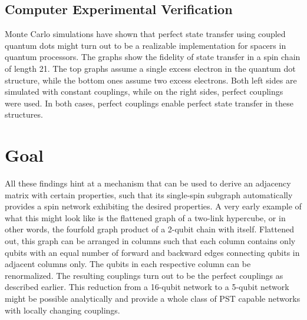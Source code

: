 \subsection{Computer Experimental Verification}

\begin{center}
\end{center}

\noindent Monte Carlo simulations have shown\cite{Nikolopoulos2004} that perfect state transfer using coupled quantum dots might turn out to be a realizable implementation for spacers in quantum processors. The graphs show the fidelity of state transfer in a spin chain of length 21. The top graphs assume a single excess electron in the quantum dot structure, while the bottom ones assume two excess electrons. Both left sides are simulated with constant couplings, while on the right sides, perfect couplings were used. In both cases, perfect couplings enable perfect state transfer in these structures. 

\section{Goal}

\begin{center}
\end{center}

\noindent All these findings hint at a mechanism that can be used to derive an adjacency matrix with certain properties, such that its single-spin subgraph automatically provides a spin network exhibiting the desired properties. A very early example of what this might look like is the flattened graph of a two-link hypercube, or in other words, the fourfold graph product of a 2-qubit chain with itself. Flattened out, this graph can be arranged in columns such that each column contains only qubits with an equal number of forward and backward edges connecting qubits in adjacent columns only. The qubits in each respective column can be renormalized\cite{Christandl2005}. The resulting couplings turn out to be the perfect couplings as described earlier. This reduction from a 16-qubit network to a 5-qubit network might be possible analytically and provide a whole class of PST capable networks with locally changing couplings.





